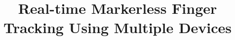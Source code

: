 \documentclass{acm_proc_article-sp}
\begin{document}
\title{Real-time Markerless Finger Tracking Using Multiple Devices}

%
%
%
%
%
\end{document}
